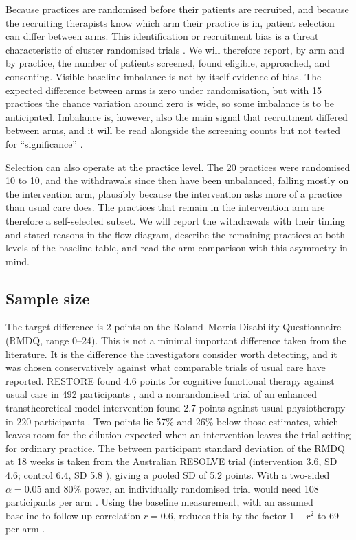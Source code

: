 \documentclass[11pt,a4paper]{article}
\begin{document}
Because practices are randomised before their patients are recruited, and
because the recruiting therapists know which arm their practice is in, patient
selection can differ between arms. This identification or recruitment bias is
a threat characteristic of cluster randomised trials
\citep{campbell2012, eldridge2009}. We will
therefore report, by arm and by practice, the number of patients screened,
found eligible, approached, and consenting. Visible baseline
imbalance is not by itself evidence of bias. The expected difference between
arms is zero under randomisation, but with 15 practices the chance variation
around zero is wide, so some imbalance is to be anticipated. Imbalance is,
however, also the main signal that recruitment differed between arms, and it
will be read alongside the screening counts but not tested for
``significance'' \citep{campbell2012, senn1994, ziliak2008}.

Selection can also operate at the practice level. The 20 practices were
randomised 10 to 10, and the withdrawals since then have been unbalanced,
falling mostly on the intervention arm, plausibly
because the intervention asks more of a practice than usual care does. The
practices that remain in the intervention arm are therefore a self-selected
subset. We will report the withdrawals with their timing and stated reasons
in the flow diagram, describe the remaining practices at both levels of the
baseline table, and read the arm comparison with this asymmetry in mind.

\subsection{Sample size}
\label{sec:samplesize}

The target difference is 2 points on the Roland--Morris Disability
Questionnaire (RMDQ, range 0--24). This is not a minimal important difference
taken from the literature. It is the difference the investigators consider
worth detecting, and it was chosen conservatively against what comparable
trials of usual care have reported. RESTORE found 4.6 points for cognitive
functional therapy against usual care in 492 participants \citep{kent2023},
and a nonrandomised trial of an enhanced transtheoretical model intervention
found 2.7 points against usual physiotherapy in 220 participants
\citep{benami2017}. Two points lie
57\% and 26\% below those estimates, which leaves room for the dilution
expected when an intervention leaves the trial setting for ordinary practice.
The between
participant standard deviation of the RMDQ at 18 weeks is taken from the
Australian RESOLVE trial (intervention 3.6, SD 4.6; control 6.4, SD 5.8
\citep{bagg2022}), giving a pooled SD of 5.2 points. With a two-sided
$\alpha = 0.05$ and 80\% power, an individually randomised trial would need
108 participants per arm \citep[section 3.2.1]{chow2018}. Using the baseline
measurement, with an assumed baseline-to-follow-up correlation $r = 0.6$,
reduces this by the factor $1-r^2$ to 69 per arm \citep{borm2007}.
\end{document}
